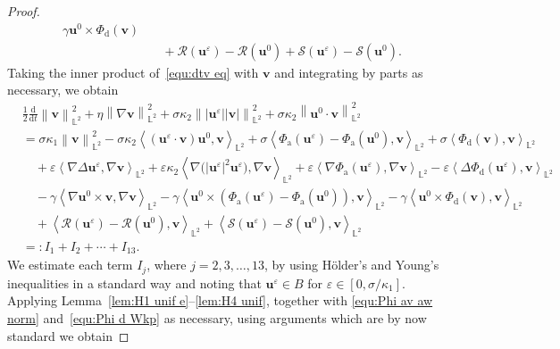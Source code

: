 \documentclass[10pt,a4paper]{amsart}
\newcommand{\bb}{\mathbb}
\newcommand{\bff}{\boldsymbol}
\newcommand{\ddt}{\frac{\mathrm{d}}{\mathrm{d}t}}
\newcommand{\inpro}[2]{\left\langle#1,#2\right\rangle}
\newcommand{\norm}[2]{\left\|{#1}\right\|_{#2}}
\begin{document}
\begin{proof}
\begin{align}
    \gamma \bff{u}^0 \times \Phi_{\mathrm{d}}(\bff{v})
    \nonumber\\
    &\quad
    +
    \mathcal{R}(\bff{u}^\varepsilon)- \mathcal{R}(\bff{u}^0)
    +
    \mathcal{S}(\bff{u}^\varepsilon)- \mathcal{S}(\bff{u}^0).
\end{align}
Taking the inner product of~\eqref{equ:dtv eq} with $\bff{v}$ and integrating by parts as necessary, we obtain
\begin{align}\label{equ:I1 to I12 Se}
    &\frac12 \ddt \norm{\bff{v}}{\bb{L}^2}^2
    +
    \eta \norm{\nabla \bff{v}}{\bb{L}^2}^2
    +
    \sigma\kappa_2 \norm{|\bff{u}^\varepsilon| |\bff{v}|}{\bb{L}^2}^2
    +
    \sigma\kappa_2 \norm{\bff{u}^0 \cdot \bff{v}}{\bb{L}^2}^2
    \nonumber\\
    &=
    \sigma\kappa_1 \norm{\bff{v}}{\bb{L}^2}^2
    -
    \sigma\kappa_2 \inpro{(\bff{u}^\varepsilon \cdot \bff{v})\bff{u}^0}{\bff{v}}_{\bb{L}^2}
    +
    \sigma \inpro{\Phi_{\mathrm{a}}(\bff{u}^\varepsilon)- \Phi_{\mathrm{a}}(\bff{u}^0)}{\bff{v}}_{\bb{L}^2}
    +
    \sigma \inpro{\Phi_{\mathrm{d}}(\bff{v})}{\bff{v}}_{\bb{L}^2}
    \nonumber\\
    &\quad
    +
    \varepsilon \inpro{\nabla\Delta \bff{u}^\varepsilon}{\nabla \bff{v}}_{\bb{L}^2}
    +
    \varepsilon\kappa_2 \inpro{\nabla\big(|\bff{u}^\varepsilon|^2 \bff{u}^\varepsilon\big)}{\nabla \bff{v}}_{\bb{L}^2}
    +
    \varepsilon \inpro{\nabla \Phi_{\mathrm{a}}(\bff{u}^\varepsilon)}{\nabla \bff{v}}_{\bb{L}^2}
    -
    \varepsilon \inpro{\Delta \Phi_{\mathrm{d}}(\bff{u}^\varepsilon)}{\bff{v}}_{\bb{L}^2}
    \nonumber\\
    &\quad
    -
    \gamma \inpro{\nabla \bff{u}^0 \times \bff{v}}{\nabla \bff{v}}_{\bb{L}^2}
    -
    \gamma \inpro{\bff{u}^0 \times \left(\Phi_{\mathrm{a}}(\bff{u}^\varepsilon)- \Phi_{\mathrm{a}}(\bff{u}^0)\right)}{\bff{v}}_{\bb{L}^2}
    -
    \gamma \inpro{\bff{u}^0 \times \Phi_{\mathrm{d}}(\bff{v})}{\bff{v}}_{\bb{L}^2}
    \nonumber\\
    &\quad
    +
    \inpro{\mathcal{R}(\bff{u}^\varepsilon)- \mathcal{R}(\bff{u}^0)}{\bff{v}}_{\bb{L}^2}
    +
    \inpro{\mathcal{S}(\bff{u}^\varepsilon)- \mathcal{S}(\bff{u}^0)}{\bff{v}}_{\bb{L}^2}
    \nonumber\\
    &=:
    I_1+I_2+\cdots +I_{13}.
\end{align}
We estimate each term $I_j$, where $j=2,3,\ldots, 13$, by using H\"older's and Young's inequalities in a standard way and noting that $\bff{u}^\varepsilon \in B$ for $\varepsilon\in [0,\sigma/\kappa_1]$. Applying Lemma~\ref{lem:H1 unif e}--\ref{lem:H4 unif}, together with \eqref{equ:Phi av aw norm} and~\eqref{equ:Phi d Wkp} as necessary, using arguments which are by now standard we obtain

\end{proof}
\end{document}
